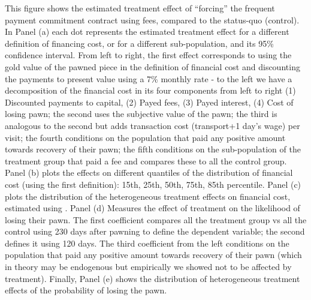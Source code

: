 \documentclass[oneside,11pt]{article}
\begin{document}
\scriptsize {
\noindent This figure shows the estimated treatment effect of ``forcing'' the frequent payment commitment contract using fees, compared to the status-quo (control). In Panel (a) each dot represents the estimated treatment effect for a different definition of financing cost, or for a different sub-population, and its 95\% confidence interval. From left to right, the first effect corresponds to using the gold value of the pawned piece in the definition of financial cost and discounting the payments to present value using a 7\% monthly rate - to the left we have a decomposition of the financial cost in its four components from left to right (1) Discounted payments to capital, (2) Payed fees, (3) Payed interest, (4) Cost of losing pawn; the second uses the subjective value of the pawn; the third is analogous to the second but adds transaction cost (transport+1 day's wage) per visit; the fourth conditions on the population that paid any positive amount towards recovery of their pawn; the fifth conditions on the sub-population of the treatment group that paid a fee and compares these to all the control group. Panel (b) plots the effects on different quantiles of the distribution of financial cost (using the first definition): 15th, 25th, 50th, 75th, 85th percentile. Panel (c) plots the distribution of the heterogeneous treatment effects on financial cost, estimated using \cite{atheygrf}. Panel (d) Measures the effect of treatment on the likelihood of losing their pawn. The first coefficient compares all the treatment group vs all the control using 230 days after pawning to define the dependent variable; the second defines it using 120 days. The third coefficient from the left conditions on the population that paid any positive amount towards recovery of their pawn (which in theory may be endogenous but empirically we showed not to be affected by treatment). Finally, Panel (e) shows the distribution of heterogeneous treatment effects of the probability of losing the pawn. %
}
\end{document}
